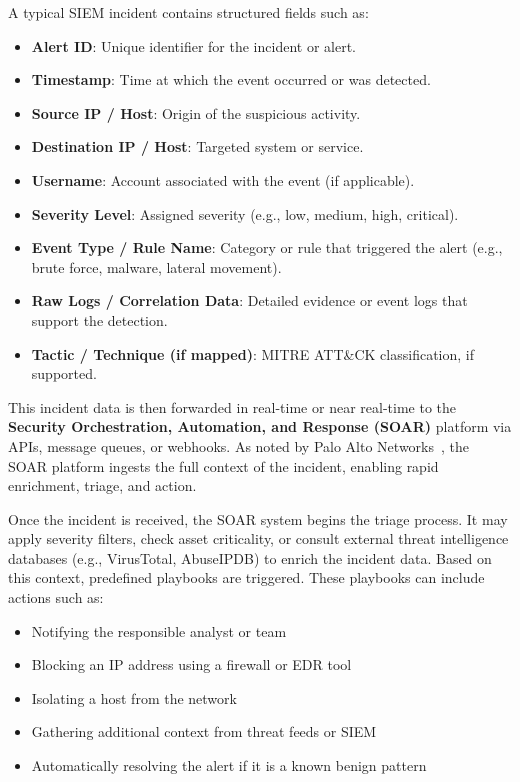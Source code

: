 A typical SIEM incident contains structured fields such as:

\begin{itemize}[itemsep=0pt,parsep=0pt,topsep=0pt,partopsep=0pt]
    \item \textbf{Alert ID}: Unique identifier for the incident or alert.
    \item \textbf{Timestamp}: Time at which the event occurred or was detected.
    \item \textbf{Source IP / Host}: Origin of the suspicious activity.
    \item \textbf{Destination IP / Host}: Targeted system or service.
    \item \textbf{Username}: Account associated with the event (if applicable).
    \item \textbf{Severity Level}: Assigned severity (e.g., low, medium, high, critical).
    \item \textbf{Event Type / Rule Name}: Category or rule that triggered the alert (e.g., brute force, malware, lateral movement).
    \item \textbf{Raw Logs / Correlation Data}: Detailed evidence or event logs that support the detection.
    \item \textbf{Tactic / Technique (if mapped)}: MITRE ATT\&CK classification, if supported.
\end{itemize}

This incident data is then forwarded in real-time or near real-time to the \textbf{Security Orchestration, Automation, and Response (SOAR)} platform via APIs, message queues, or webhooks. As noted by Palo Alto Networks~\cite{paloalto}, the SOAR platform ingests the full context of the incident, enabling rapid enrichment, triage, and action.

Once the incident is received, the SOAR system begins the triage process. It may apply severity filters, check asset criticality, or consult external threat intelligence databases (e.g., VirusTotal, AbuseIPDB) to enrich the incident data. Based on this context, predefined playbooks are triggered. These playbooks can include actions such as:

\begin{itemize}[itemsep=0pt,parsep=0pt,topsep=0pt,partopsep=0pt]
    \item Notifying the responsible analyst or team
    \item Blocking an IP address using a firewall or EDR tool
    \item Isolating a host from the network
    \item Gathering additional context from threat feeds or SIEM
    \item Automatically resolving the alert if it is a known benign pattern
\end{itemize}

